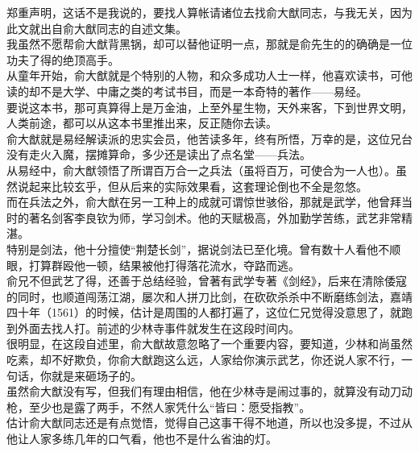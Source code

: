 \begin{multicols}{\theparacolNo}
郑重声明，这话不是我说的，要找人算帐请诸位去找俞大猷同志，与我无关，因为此文就出自俞大猷同志的自述文集。\\

我虽然不愿帮俞大猷背黑锅，却可以替他证明一点，那就是俞先生的的确确是一位功夫了得的绝顶高手。\\

从童年开始，俞大猷就是个特别的人物，和众多成功人士一样，他喜欢读书，可他读的却不是大学、中庸之类的考试书目，而是一本奇特的著作——易经。\\

要说这本书，那可真算得上是万金油，上至外星生物，天外来客，下到世界文明，人类前途，都可以从这本书里推出来，反正随你去读。\\

俞大猷就是易经解读派的忠实会员，他苦读多年，终有所悟，万幸的是，这位兄台没有走火入魔，摆摊算命，多少还是读出了点名堂——兵法。\\

从易经中，俞大猷领悟了所谓百万合一之兵法（虽将百万，可使合为一人也）。虽然说起来比较玄乎，但从后来的实际效果看，这套理论倒也不全是忽悠。\\

而在兵法之外，俞大猷在另一工种上的成就可谓惊世骇俗，那就是武学，他曾拜当时的著名剑客李良钦为师，学习剑术。他的天赋极高，外加勤学苦练，武艺非常精湛。\\

特别是剑法，他十分擅使“荆楚长剑”，据说剑法已至化境。曾有数十人看他不顺眼，打算群殴他一顿，结果被他打得落花流水，夺路而逃。\\

俞兄不但武艺了得，还善于总结经验，曾著有武学专著《剑经》，后来在清除倭寇的同时，也顺道闯荡江湖，屡次和人拼刀比剑，在砍砍杀杀中不断磨练剑法，嘉靖四十年（1561）的时候，估计是周围的人都打遍了，这位仁兄觉得没意思了，就跑到外面去找人打。前述的少林寺事件就发生在这段时间内。\\

很明显，在这段自述里，俞大猷故意忽略了一个重要内容，要知道，少林和尚虽然吃素，却不好欺负，你俞大猷跑这么远，人家给你演示武艺，你还说人家不行，一句话，你就是来砸场子的。\\

虽然俞大猷没有写，但我们有理由相信，他在少林寺是闹过事的，就算没有动刀动枪，至少也是露了两手，不然人家凭什么“皆曰：愿受指教”。\\

估计俞大猷同志还是有点觉悟，觉得自己这事干得不地道，所以也没多提，不过从他让人家多练几年的口气看，他也不是什么省油的灯。\\


\end{multicols}
